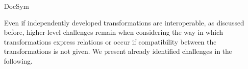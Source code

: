 \begin{copiedFrom}{DocSym}

Even if independently developed transformations are interoperable, as discussed before, higher-level challenges remain when considering the way in which transformations express relations or occur if compatibility between the transformations is not given.
We present already identified challenges in the following. %



\end{copiedFrom}
